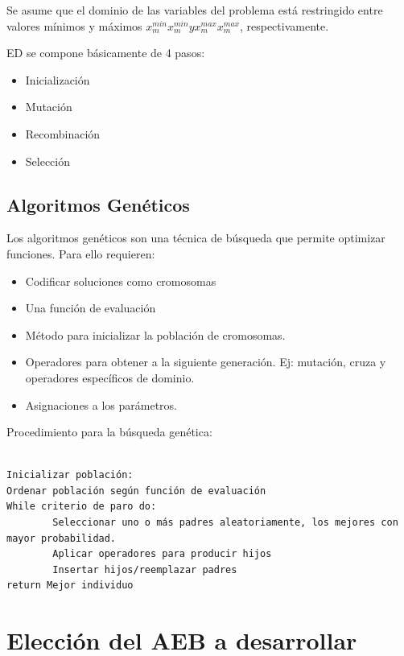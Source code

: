 \documentclass[a4paper,twocolumn,10pt]{article}
\begin{document}
Se asume que el dominio de las variables del problema está restringido entre valores mínimos y máximos ${\displaystyle x_{m}^{min}}{\displaystyle x_{m}^{min}} y {\displaystyle x_{m}^{max}}{\displaystyle x_{m}^{max}}$, respectivamente.

ED se compone básicamente de 4 pasos:
\begin{itemize}
    \item Inicialización
    \item Mutación
    \item Recombinación
    \item Selección

\end{itemize}



\subsection*{Algoritmos Genéticos}

Los algoritmos genéticos son una técnica de búsqueda que permite optimizar funciones. Para ello requieren:

\begin{itemize}
    \item Codificar soluciones como cromosomas
    \item Una función de evaluación
    \item Método para inicializar la población de cromosomas.
    \item Operadores para obtener a la siguiente generación. Ej: mutación, cruza y operadores específicos de dominio.
    \item Asignaciones a los parámetros.
\end{itemize}

Procedimiento para la búsqueda genética:
\begin{verbatim}

Inicializar población:
Ordenar población según función de evaluación
While criterio de paro do:
        Seleccionar uno o más padres aleatoriamente, los mejores con mayor probabilidad.
        Aplicar operadores para producir hijos
        Insertar hijos/reemplazar padres
return Mejor individuo
\end{verbatim}





\section{Elección del AEB a
desarrollar}
\end{document}
